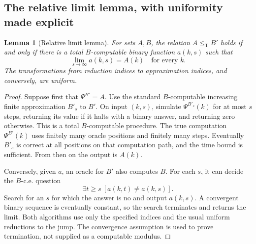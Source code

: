 \documentclass[11pt,a4paper]{article}
\newcommand{\leT}{\leq_{\mathrm T}}
\newtheorem{lemma}[theorem]{Lemma}
\theoremstyle{definition}\newtheorem{definition}[theorem]{Definition}
\theoremstyle{remark}\newtheorem{remark}[theorem]{Remark}
\begin{document}
\subsection{The relative limit lemma, with uniformity made explicit}
\begin{lemma}[Relative limit lemma]\label{lem:limit}
For sets $A,B$, the relation $A\leT B'$ holds if and only if there is a total $B$-computable binary function $a(k,s)$ such that
\[
 \lim_{s\to\infty}a(k,s)=A(k)\quad\text{for every }k.
\]
The transformations from reduction indices to approximation indices, and conversely, are uniform.
\end{lemma}
\begin{proof}
Suppose first that $\Psi^{B'}=A$. Use the standard $B$-computable increasing finite approximation $B'_s$ to $B'$. On input $(k,s)$, simulate $\Psi^{B'_s}(k)$ for at most $s$ steps, returning its value if it halts with a binary answer, and returning zero otherwise. This is a total $B$-computable procedure. The true computation $\Psi^{B'}(k)$ uses finitely many oracle positions and finitely many steps. Eventually $B'_s$ is correct at all positions on that computation path, and the time bound is sufficient. From then on the output is $A(k)$.

Conversely, given $a$, an oracle for $B'$ also computes $B$. For each $s$, it can decide the $B$-c.e. question
\[
 \exists t\geq s\ [a(k,t)\ne a(k,s)].
\]
Search for an $s$ for which the answer is no and output $a(k,s)$. A convergent binary sequence is eventually constant, so the search terminates and returns the limit. Both algorithms use only the specified indices and the usual uniform reductions to the jump. The convergence assumption is used to prove termination, not supplied as a computable modulus.
\end{proof}
\end{document}
